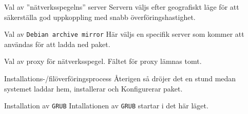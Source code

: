            {Val av ''nätverksspegelns'' server}
           {Servern väljs efter geografiskt läge för att säkerställa god
            uppkoppling med snabb överföringshastighet.}
           {}

           {Val av \texttt{Debian archive mirror}}
           {Här väljs en specifik server som kommer att användas för att
            ladda ned paket.}
           {}

           {Val av proxy för nätverksspegel.}
           {Fältet för proxy lämnas tomt.}
           {}

           {Installations-/filöverföringsprocess}
           {Återigen så dröjer det en stund medan systemet laddar hem,
            installerar och Konfigurerar paket.}
           {}

           {Installation av \texttt{GRUB}}
           {Intallationen av \texttt{GRUB} startar i det här läget.}
           {}

